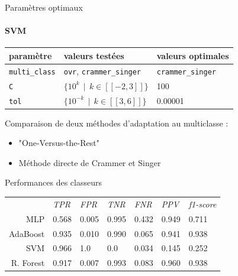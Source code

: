 \documentclass[usenames,dvipsnames]{beamer}
\begin{document}
\begin{frame}{Paramètres optimaux}
\framesubtitle{SVM}

\begin{table}
\centering
\begin{tabular}{lll}
paramètre & valeurs testées & valeurs optimales \\
\hline
\texttt{multi\_class} & \texttt{ovr}, \texttt{crammer\_singer} & \texttt{crammer\_singer} \\
\texttt{C} & $\{10^k \>\> | \>\> k \in [\![-2, 3]\!] \}$ & 100 \\
\texttt{tol} & $\{10^{-k} \>\> | \>\> k \in [\![3, 6]\!] \}$ & 0.00001 \\
\end{tabular}

\end{table}

\bigskip

Comparaison de deux méthodes d'adaptation au multiclasse :

\begin{itemize}
\item "One-Versus-the-Rest"
\item Méthode directe de Crammer et Singer
\end{itemize}

\end{frame}


\begin{frame}{Performances des classeurs}
\begin{table}
\centering
\begin{tabular}{r | llllll}
& \emph{TPR} & \emph{FPR} & \emph{TNR} & \emph{FNR} & \emph{PPV} & \emph{f1-score} \\ 
MLP & 0.568 & 0.005 & 0.995 & 0.432 & 0.949 & 0.711 \\
AdaBoost & 0.935 & 0.010 & 0.990 & 0.065 & 0.941 & 0.938 \\
SVM & 0.966 & 1.0 & 0.0 & 0.034 & 0.145 & 0.252 \\
R. Forest & 0.917 & 0.007 & 0.993 & 0.083 & 0.960 & 0.938 \\
\end{tabular}
\end{table}
\end{frame}
\end{document}
